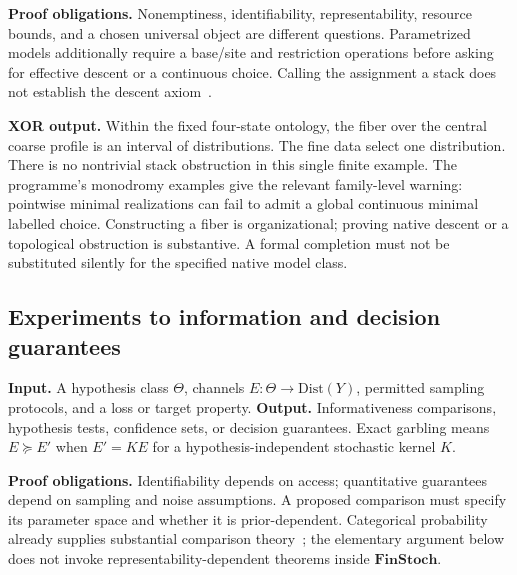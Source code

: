 \documentclass[11pt]{article}
\theoremstyle{definition}
\begin{document}
\textbf{Proof obligations.} Nonemptiness, identifiability, representability, resource bounds, and a chosen universal object are different questions. Parametrized models additionally require a base/site and restriction operations before asking for effective descent or a continuous choice. Calling the assignment a stack does not establish the descent axiom~\cite{Stacks}.

\textbf{XOR output.} Within the fixed four-state ontology, the fiber over the central coarse profile is an interval of distributions. The fine data select one distribution. There is no nontrivial stack obstruction in this single finite example. The programme's monodromy examples give the relevant family-level warning: pointwise minimal realizations can fail to admit a global continuous minimal labelled choice. Constructing a fiber is organizational; proving native descent or a topological obstruction is substantive. A formal completion must not be substituted silently for the specified native model class.

\subsection{Experiments to information and decision guarantees}
\textbf{Input.} A hypothesis class $\Theta$, channels $E:\Theta\to\mathrm{Dist}(Y)$, permitted sampling protocols, and a loss or target property. \textbf{Output.} Informativeness comparisons, hypothesis tests, confidence sets, or decision guarantees. Exact garbling means $E\succeq E'$ when $E'=KE$ for a hypothesis-independent stochastic kernel $K$.

\textbf{Proof obligations.} Identifiability depends on access; quantitative guarantees depend on sampling and noise assumptions. A proposed comparison must specify its parameter space and whether it is prior-dependent. Categorical probability already supplies substantial comparison theory~\cite{FritzEtAl}; the elementary argument below does not invoke representability-dependent theorems inside $\mathbf{FinStoch}$.
\end{document}
